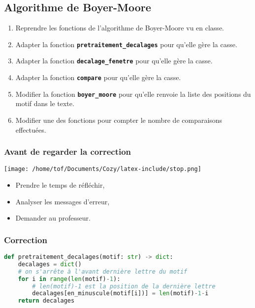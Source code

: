 \documentclass[svgnames,11pt]{beamer}
\begin{document}
\subsection{Algorithme de Boyer-Moore}
\begin{activite}
\begin{enumerate}
    \item Reprendre les fonctions de l'algorithme de Boyer-Moore vu en classe.
    \item Adapter la fonction \textbf{\texttt{pretraitement\_decalages}} pour qu'elle gère la casse.
    \item Adapter la fonction \textbf{\texttt{decalage\_fenetre}} pour qu'elle gère la casse.
    \item Adapter la fonction \textbf{\texttt{compare}} pour qu'elle gère la casse.
    \item Modifier la fonction \textbf{\texttt{boyer\_moore}} pour qu'elle renvoie la liste des positions du motif dans le texte.
    \item Modifier une des fonctions pour compter le nombre de comparaisons effectuées.
\end{enumerate}
\end{activite}
\begin{frame}
    \frametitle{Avant de regarder la correction}
\begin{center}
    \centering
    \texttt{[image: /home/tof/Documents/Cozy/latex-include/stop.png]}
    \end{center}
{\Large
    \begin{itemize}
        \item Prendre le temps de réfléchir,
        \item Analyser les messages d'erreur,
        \item Demander au professeur.
    \end{itemize}
}
\end{frame}
\begin{frame}[fragile]
    \frametitle{Correction}

    \begin{center}
    \begin{lstlisting}[language=Python , basicstyle=\small, xleftmargin=2em, xrightmargin=2em]
def pretraitement_decalages(motif: str) -> dict:
    decalages = dict()
    # on s'arrête à l'avant dernière lettre du motif
    for i in range(len(motif)-1):
        # len(motif)-1 est la position de la dernière lettre
        decalages[en_minuscule(motif[i])] = len(motif)-1-i
    return decalages    
\end{lstlisting}
    \end{center}

\end{frame}
\end{document}
